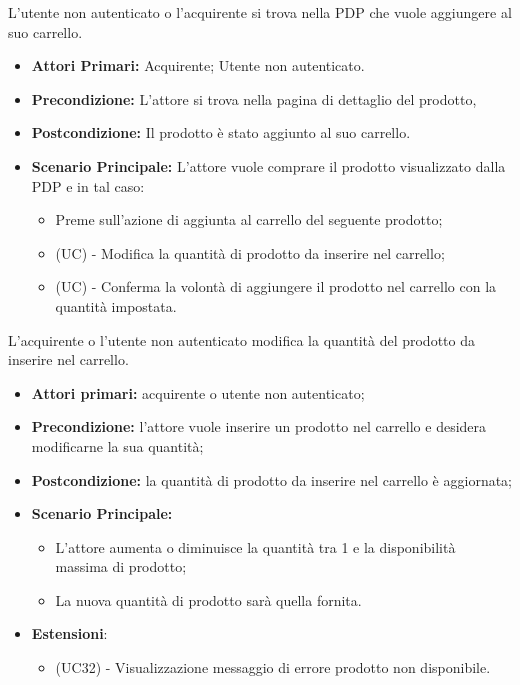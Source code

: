 L'utente non autenticato o l'acquirente si trova nella PDP che vuole aggiungere al suo carrello.
\begin{itemize}
    \item \textbf{Attori Primari:} Acquirente; Utente non autenticato.
    \item \textbf{Precondizione:} L'attore si trova nella pagina di dettaglio del prodotto,
    \item \textbf{Postcondizione:} Il prodotto è stato aggiunto al suo carrello.
    \item \textbf{Scenario Principale:} L'attore vuole comprare il prodotto visualizzato dalla PDP e in tal caso:
    \begin{itemize}
        \item Preme sull'azione di aggiunta al carrello del seguente prodotto;
        \item (UC) - Modifica la quantità di prodotto da inserire nel carrello;
        \item (UC) - Conferma la volontà di aggiungere il prodotto nel carrello con la quantità impostata.
    \end{itemize}
\end{itemize}

L'acquirente o l'utente non autenticato modifica la quantità del prodotto da inserire nel carrello.
\begin{itemize}
	\item \textbf{Attori primari:} acquirente o utente non autenticato;
	\item \textbf{Precondizione:} l'attore vuole inserire un prodotto nel carrello e desidera modificarne la sua quantità;
	\item \textbf{Postcondizione:} la quantità di prodotto da inserire nel carrello è aggiornata;
	\item \textbf{Scenario Principale:}
	\begin{itemize}
		\item L'attore aumenta o diminuisce la quantità tra 1 e la disponibilità massima di prodotto;
		\item La nuova quantità di prodotto sarà quella fornita.
	\end{itemize}
	\item \textbf{Estensioni}:
	\begin{itemize}
		\item (UC32) - Visualizzazione messaggio di errore prodotto non disponibile.
	\end{itemize}
\end{itemize}